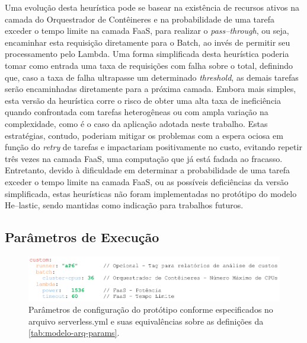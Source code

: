 \documentclass[english,brazilian]{UNISINOSmonografia} %
\begin{document}
Uma evolução desta heurística pode se basear na existência de recursos ativos na camada do Orquestrador de Contêineres e na probabilidade de uma tarefa exceder o tempo limite na camada FaaS, para realizar o \textit{pass--through}, ou seja, encaminhar esta requisição diretamente para o Batch, ao invés de permitir seu processamento pelo Lambda.
%
Uma forma simplificada desta heurística poderia tomar como entrada uma taxa de requisições com falha sobre o total, definindo que, caso a taxa de falha ultrapasse um determinado \textit{threshold}, as demais tarefas serão encaminhadas diretamente para a próxima camada.
%
Embora mais simples, esta versão da heurística corre o risco de obter uma alta taxa de ineficiência quando confrontada com tarefas heterogêneas ou com ampla variação na complexidade, como é o caso da aplicação adotada neste trabalho.
%
Estas estratégias, contudo, poderiam mitigar os problemas com a espera ociosa em função do \textit{retry} de tarefas e impactariam positivamente no custo, evitando repetir três vezes na camada FaaS, uma computação que já está fadada ao fracasso.
%
Entretanto, devido à dificuldade em determinar a probabilidade de uma tarefa exceder o tempo limite na camada FaaS, ou as possíveis deficiências da versão simplificada, estas heurísticas não foram implementadas no protótipo do modelo \textsf{He}--lastic, sendo mantidas como indicação para trabalhos futuros.




\subsection{Parâmetros de Execução}


\begin{figure}[b]
	\centering%
	\begin{minipage}{\textwidth}
		\caption{Parâmetros de configuração do protótipo conforme especificados no arquivo serverless.yml e suas equivalências sobre as definições da \autoref{tab:modelo-arq-params}.}
		\label{fig:metodologia-parametros-yaml}
		\vspace{1ex}
		\includegraphics[width=\textwidth]{metodologia-parametros-yaml}
	\end{minipage}
\end{figure}
\end{document}
